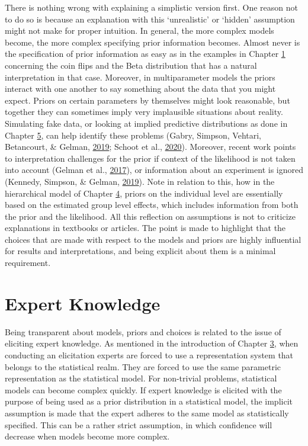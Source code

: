 \documentclass[openright,titlepage,12pt,a4paper]{book}
\begin{document}
There is nothing wrong with explaining a simplistic version first. One reason not to do so is because an explanation with this `unrealistic' or `hidden' assumption might not make for proper intuition. In general, the more complex models become, the more complex specifying prior information becomes. Almost never is the specification of prior information as easy as in the examples in Chapter \protect\hyperlink{introduction}{1} concerning the coin flips and the Beta distribution that has a natural interpretation in that case. Moreover, in multiparameter models the priors interact with one another to say something about the data that you might expect. Priors on certain parameters by themselves might look reasonable, but together they can sometimes imply very implausible situations about reality. Simulating fake data, or looking at implied predictive distributions as done in Chapter \protect\hyperlink{Burns}{5}, can help identify these problems (Gabry, Simpson, Vehtari, Betancourt, \& Gelman, \protect\hyperlink{ref-gabry_visualization_2019}{2019}; Schoot et al., \protect\hyperlink{ref-van_de_schoot_tutorial_2020}{2020}). Moreover, recent work points to interpretation challenges for the prior if context of the likelihood is not taken into account (Gelman et al., \protect\hyperlink{ref-gelman_prior_2017}{2017}), or information about an experiment is ignored (Kennedy, Simpson, \& Gelman, \protect\hyperlink{ref-kennedy_experiment_2019}{2019}). Note in relation to this, how in the hierarchical model of Chapter \protect\hyperlink{Hierarchical}{4}, priors on the individual level are essentially based on the estimated group level effects, which includes information from both the prior and the likelihood. All this reflection on assumptions is not to criticize explanations in textbooks or articles. The point is made to highlight that the choices that are made with respect to the models and priors are highly influential for results and interpretations, and being explicit about them is a minimal requirement.

\hypertarget{expert-knowledge}{%
\section{Expert Knowledge}\label{expert-knowledge}}

Being transparent about models, priors and choices is related to the issue of eliciting expert knowledge. As mentioned in the introduction of Chapter \protect\hyperlink{DAC1}{3}, when conducting an elicitation experts are forced to use a representation system that belongs to the statistical realm. They are forced to use the same parametric representation as the statistical model. For non-trivial problems, statistical models can become complex quickly. If expert knowledge is elicited with the purpose of being used as a prior distribution in a statistical model, the implicit assumption is made that the expert adheres to the same model as statistically specified. This can be a rather strict assumption, in which confidence will decrease when models become more complex.
\end{document}
